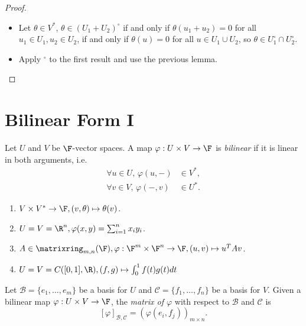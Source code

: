 \documentclass[a4paper]{article}
\newcommand*{\M}{\matrixring}
\newcommand*{\ann}{\circ}
\newcommand*{\basis}{\mathcal}
\theoremstyle{definition}
\begin{document}
\begin{proof}\leavevmode
  \begin{itemize}
  \item Let \(\theta \in V^*\), \(\theta \in (U_1+U_2)^\ann\) if and only if \(\theta(u_1+u_2) = 0\) for all \(u_1\in U_1, u_2 \in U_2\), if and only if \(\theta(u) = 0\) for all \(u \in U_1 \cup U_2\), so \(\theta\in U_1^\ann \cap U_2^\ann\).
  \item Apply \(^\ann\) to the first result and use the previous lemma.
  \end{itemize}
\end{proof}

\section{Bilinear Form I}

\begin{definition}
  Let \(U\) and \(V\) be \(\F\)-vector spaces. A map \(\varphi: U \times V \to \F\) is \emph{bilinear} if it is linear in both arguments, i.e.
  \begin{align*}
    \forall u \in U, \, \varphi(u, -) &\in V^*, \\
    \forall v \in V, \, \varphi(-, v) &\in U^*.
  \end{align*}
\end{definition}

\begin{eg}\leavevmode
  \begin{enumerate}
  \item \(V \times V^* \to \F, (v, \theta) \mapsto \theta(v)\).
  \item \(U = V = \R^n, \varphi(x, y) = \sum_{i=1}^{n}x_iy_i\).
  \item \(A \in \M_{m,n}(\F), \varphi: \F^m \times \F^n \to \F, (u, v) \mapsto u^TAv\).
  \item \(U = V = C([0, 1], \R), (f, g) \mapsto \int_{0}^{1} f(t)g(t) dt \)
  \end{enumerate}
\end{eg}

\begin{definition}
  Let \(\basis B = \{e_1,\dots,e_m\}\) be a basis for \(U\) and \(\basis C = \{f_1,\dots,f_n\}\) be a basis for \(V\). Given a bilinear map \(\varphi: U \times V \to \F\), the \emph{matrix of \(\varphi\)} with respect to \(\basis B\) and \(\basis C\) is
  \[
    [\varphi]_{\basis B, \basis C} = \left( \varphi(e_i, f_j) \right)_{m \times n}.
  \]
\end{definition}
\end{document}
